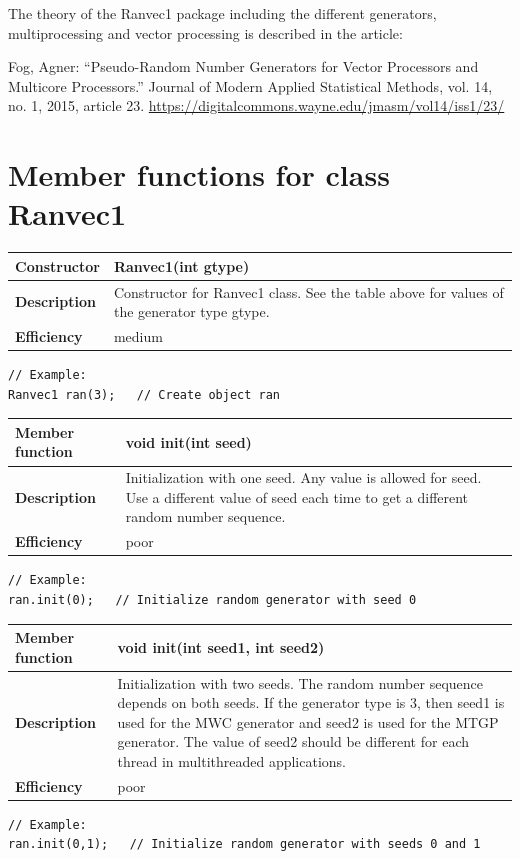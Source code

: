 \documentclass[11pt,a4paper,oneside,openright]{report}
\newcommand{\vspacesmall}{\vspace{3mm}}
\newcommand{\vspacebig}{\vspace{6mm}}
\begin{document}
The theory of the Ranvec1 package including the different generators, multiprocessing and vector processing is described in the article: 
\label{Fog2015TheoryArticle}

Fog, Agner: “Pseudo-Random Number Generators for Vector Processors and Multicore Processors.” Journal of Modern Applied Statistical Methods, vol. 14, no. 1, 2015, article 23. \url{https://digitalcommons.wayne.edu/jmasm/vol14/iss1/23/}
\vspacebig

\section{Member functions for class Ranvec1}\label{MemberFunctions}
\vspacesmall

\begin{tabular}{|p{30mm}|p{100mm}|}
\hline
\bfseries Constructor & Ranvec1(int gtype) \\ \hline
\bfseries Description & Constructor for Ranvec1 class. See the table above for values of the generator type gtype. \\ \hline
\bfseries Efficiency & medium \\ \hline
\end{tabular}
\begin{lstlisting}[frame=none]
// Example:
Ranvec1 ran(3);   // Create object ran
\end{lstlisting}
\vspacesmall

\begin{tabular}{|p{30mm}|p{100mm}|}
\hline
\bfseries Member function & void init(int seed) \\ \hline
\bfseries Description & Initialization with one seed. Any value is allowed for seed. Use a different value of seed each time to get a different random number sequence. \\ \hline
\bfseries Efficiency & poor \\ \hline
\end{tabular}
\begin{lstlisting}[frame=none]
// Example:
ran.init(0);   // Initialize random generator with seed 0
\end{lstlisting}
\vspacesmall

\begin{tabular}{|p{30mm}|p{100mm}|}
\hline
\bfseries Member function & void init(int seed1, int seed2) \\ \hline
\bfseries Description & Initialization with two seeds. The random number sequence depends on both seeds. If the generator type is 3, then seed1 is used for the MWC generator and seed2 is used for the MTGP generator. The value of seed2 should be different for each thread in multithreaded applications. \\ \hline
\bfseries Efficiency & poor \\ \hline
\end{tabular}
\begin{lstlisting}[frame=none]
// Example:
ran.init(0,1);   // Initialize random generator with seeds 0 and 1
\end{lstlisting}
\vspacesmall
\end{document}
